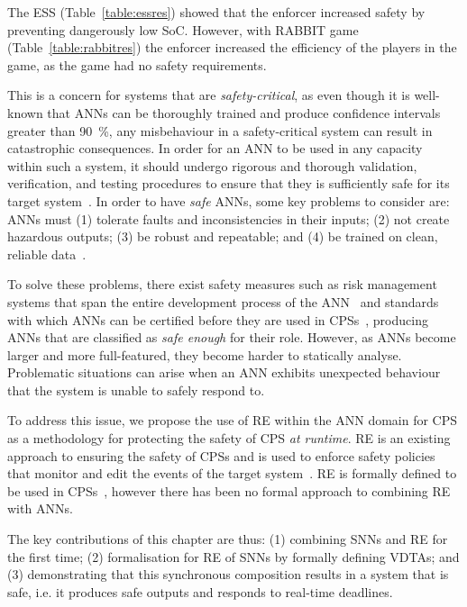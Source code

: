 The \ac{ESS} (Table~\ref{table:essres}) showed that the enforcer increased safety by preventing dangerously low \acf{SoC}.
However, with RABBIT game (Table~\ref{table:rabbitres}) the enforcer increased the efficiency of the players in the game, as the game had no safety requirements.







This is a concern for systems that are \textit{safety-critical}, as even though it is well-known that \acp{ANN} can be thoroughly trained and produce confidence intervals greater than 90~\%, any misbehaviour in a safety-critical system can result in  catastrophic consequences.
In order for an \ac{ANN} to be used in any capacity within such a system, it should undergo rigorous and thorough validation, verification, and testing procedures to ensure that they is sufficiently safe for its target system~\cite{scann, ANNSafetyLifecycle2003}.
In order to have \textit{safe} \acp{ANN}, some key problems to consider are: \acp{ANN} must (1) tolerate faults and inconsistencies in their inputs; (2) not create hazardous outputs; (3) be robust and repeatable; and (4) be trained on clean, reliable data~\cite{EstSafeCriteria2003}.

To solve these problems, there exist safety measures such as risk management systems that span the entire development process of the \ac{ANN}~\cite{ANNDevModel1999} and standards with which \acp{ANN} can be certified before they are used in \acp{CPS}~\cite{SCANNStandard}, producing \acp{ANN} that are classified as \textit{safe enough} for their role. 
However, as \acp{ANN} become larger and more full-featured, they  become harder to statically analyse.
Problematic situations can arise when an \ac{ANN} exhibits unexpected behaviour that the system is unable to safely respond to.

To address this issue, we propose the use of \ac{RE} within the \ac{ANN} domain for \ac{CPS} as a methodology for protecting the safety of \ac{CPS} \textit{at runtime}.
\ac{RE} is an existing approach to ensuring the safety of \acp{CPS} and is used to enforce safety policies that monitor and edit the events of the target system~\cite{rta-cps}.
\ac{RE} is formally defined to be used in \acp{CPS}~\cite{recps}, however there has been no formal approach to combining \ac{RE} with \acp{ANN}. 

The key contributions of this chapter are thus: (1) combining \acp{SNN} and \ac{RE} for the first time; (2) formalisation for \ac{RE} of \acp{SNN} by formally defining \acfp{VDTA}; and (3) demonstrating that this synchronous composition results in a system that is safe, i.e. it produces safe outputs and responds to real-time deadlines. 





